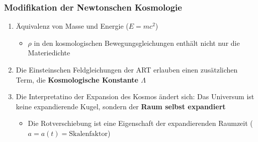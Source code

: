 \subsubsection{Modifikation der Newtonschen Kosmologie}
\begin{enumerate}[label={$(\alph*)$}]
	\item Äquivalenz von Masse und Energie ($E=mc^2$)
		\begin{itemize}[label={$\Rightarrow$}]
			\item $\rho$ in den kosmologischen Bewegungsgleichungen enthält nicht nur die Materiedichte
		\end{itemize}
	\item Die Einsteinschen Feldgleichungen der ART erlauben einen zusätzlichen Term, die \textbf{Kosmologische Konstante $\Lambda$}
	\item Die Interpretatino der Expansion des Kosmos ändert sich: Das Universum ist keine expandierende Kugel, sondern der \textbf{Raum selbst expandiert}
		\begin{itemize}[label={$\Rightarrow$}]
			\item Die Rotverschiebung ist eine Eigenschaft der expandierenden Raumzeit ($a=a(t)=\text{Skalenfaktor}$)
		\end{itemize}
\end{enumerate}
